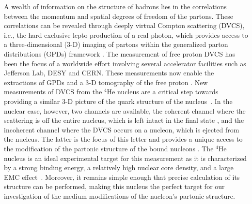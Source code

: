 \documentclass[twocolumn,nofootinbib,showpacs,prl,superscriptaddress,secnumarabic,amssymb,nobibnotes,aps,floatfix]{revtex4}
\begin{document}
A wealth of information on the structure of hadrons lies in the correlations 
between the momentum and spatial degrees of freedom of the partons. These 
correlations can be revealed through deeply virtual Compton scattering (DVCS), 
i.e., the hard exclusive lepto-production of a real photon, which provides 
access to a three-dimensional (3-D) imaging of partons within the generalized 
parton distributions (GPDs) framework 
\cite{Mueller:1998fv,Ji:1996ek,Ji:1996nm,Radyushkin:1996nd,Radyushkin:1997ki}.   
The measurement of free proton DVCS has been the focus of a worldwide effort 
\cite{Stepanyan:2001sm,Airapetian:2001yk,Airapetian:2006zr,Chekanov:2003ya,Aktas:2005ty,Chen:2006na,Defurne:2015kxq,Girod:2007aa,Mazouz:2007aa,Gavalian:2009,Seder:2015,Pisano:2015,Jo:2015ema}
involving several accelerator facilities such as Jefferson Lab, DESY and  
CERN. These measurements now enable the extractions of GPDs 
and a 3-D tomography of the free proton \cite{Guidal:2013rya,Dupre:2016mai}.  
New measurements of DVCS from the $^{4}$He nucleus are a critical step towards 
providing a similar 3-D picture of the quark structure of the 
nucleus~\cite{Dupre:2015jha}. In the nuclear case, however, two channels are 
available, the coherent channel where the scattering is off the entire nucleus, 
which is left intact in the final state \cite{Airapetian:2009cga,
Hattawy:2017woc}, and the incoherent channel where the DVCS occurs on a 
nucleon, which is ejected from the nucleus. The latter is the focus of this 
letter and provides a unique access to the modification of the partonic 
structure of the bound nucleons \cite{simonetta_2,Guzey:2006xi,Guzey:2008fe}.  
The $^{4}$He nucleus is an ideal experimental target for this measurement as it 
is characterized by a strong binding energy, a relatively high nuclear core 
density, and a large EMC effect~\cite{JSeely}. Moreover, it remains simple 
enough that precise calculation of its structure can be performed, making this 
nucleus the perfect target for our investigation of the medium modifications of 
the nucleon's partonic structure. 
\end{document}
